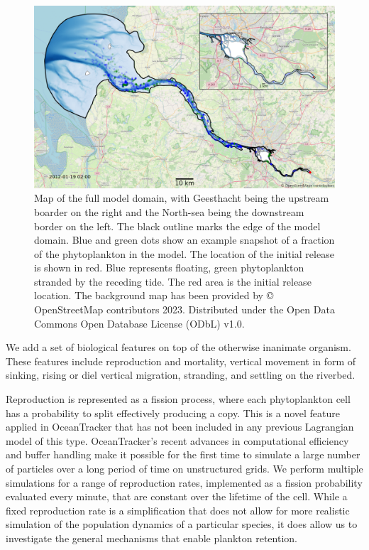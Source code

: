 \documentclass[npg, manuscript]{copernicus}
\begin{document}
\begin{figure}
    \includegraphics[width=12cm]{model_domain_wcopyright.png}
    \caption{Map of the full model domain, with Geesthacht being the upstream boarder on the right and the North-sea being the downstream border on the left. The black outline marks the edge of the model domain. Blue and green dots show an example snapshot of a fraction of the phytoplankton in the model. The location of the initial release is shown in red. Blue represents floating, green phytoplankton stranded by the receding tide. The red area is the initial release location. The background map has been provided by © OpenStreetMap contributors 2023. Distributed under the Open Data Commons Open Database License (ODbL) v1.0.}
    \label{fig:model_domain}
\end{figure}

We add a set of biological features on top of the otherwise inanimate organism.
These features include reproduction and mortality, vertical movement in form of sinking, rising or diel vertical migration, stranding, and settling on the riverbed.

Reproduction is represented as a fission process, where each phytoplankton cell has a probability to split effectively producing a copy.
This is a novel feature applied in OceanTracker that has not been included in any previous Lagrangian model of this type.
OceanTracker's recent advances in computational efficiency \citep{Vennell2021} and buffer handling make it possible for the first time to simulate a large number of particles over a long period of time on unstructured grids.
We perform multiple simulations for a range of reproduction rates, implemented as a fission probability evaluated every minute, that are constant over the lifetime of the cell.
While a fixed reproduction rate is a simplification that does not allow for more realistic simulation of the population dynamics of a particular species, it does allow us to investigate the general mechanisms that enable plankton retention.
\end{document}
